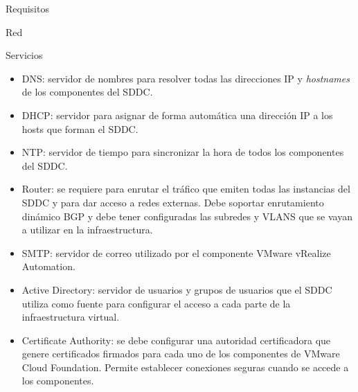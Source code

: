 \begin{section}{Requisitos}
\begin{subsection}{Red}
\begin{subsubsection}{Servicios}
     \begin{itemize}
         \item DNS: servidor de nombres para resolver todas las direcciones IP y \textit{hostnames} de los componentes del SDDC.
         \item DHCP: servidor para asignar de forma automática una dirección IP a los hosts que forman el SDDC.
         \item NTP: servidor de tiempo para sincronizar la hora de todos los componentes del SDDC.
         \item Router: se requiere para enrutar el tráfico que emiten todas las instancias del SDDC y para dar acceso a redes externas. Debe soportar enrutamiento dinámico BGP y debe tener configuradas las subredes y VLANS que se vayan a utilizar en la infraestructura.
         \item SMTP: servidor de correo utilizado por el componente VMware vRealize Automation.
         \item Active Directory: servidor de usuarios y grupos de usuarios que el SDDC utiliza como fuente para configurar el acceso a cada parte de la infraestructura virtual.
         \item Certificate Authority: se debe configurar una autoridad certificadora que genere certificados firmados para cada uno de los componentes de VMware Cloud Foundation. Permite establecer conexiones seguras cuando se accede a los componentes.
     \end{itemize}
 \end{subsubsection}
\end{subsection}


\end{section}


